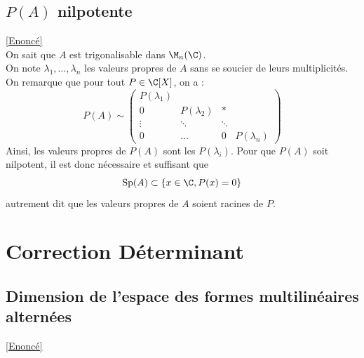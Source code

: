 \documentclass[8pt]{book}
\begin{document}
	\subsection{$P(A)$ nilpotente}
	\label{P(A) nilpotente corrigé}
	\textcolor{blue}{\hyperref[P(A) nilpotente]{[Enoncé]}}\\
	On sait que $A$ est trigonalisable dans $\M_n(\C)$.\\
	On note $\lambda_1,\dots,\lambda_n$ les valeurs propres de $A$ sans se soucier de leurs multiplicités.\\
	On remarque que pour tout $P\in\C[X]$, on a : 
	\[P(A)\sim\begin{pmatrix}
		P(\lambda_1) & & & \\
		0&P(\lambda_2)& *& \\
		\vdots& \ddots& \ddots & \\
		0&\dots &0 & P(\lambda_n)
	\end{pmatrix}\]
	Ainsi, les valeurs propres de $P(A)$ sont les $P(\lambda_i)$.
	Pour que $P(A)$ soit nilpotent, il est donc nécessaire et suffisant que \[\text{Sp}(A)\subset \{x\in \C, P(x)=0\}\] autrement dit que les valeurs propres de $A$ soient racines de $P$.
	
	\newpage
\section{Correction Déterminant}
	\subsection{Dimension de l'espace des formes multilinéaires alternées}
	\label{Dimension de l'espace des formes multilinéaires alternées corrigé}
	\textcolor{blue}{\hyperref[Dimension de l'espace des formes multilinéaires alternées]{[Enoncé]}}\\
	
\end{document}

